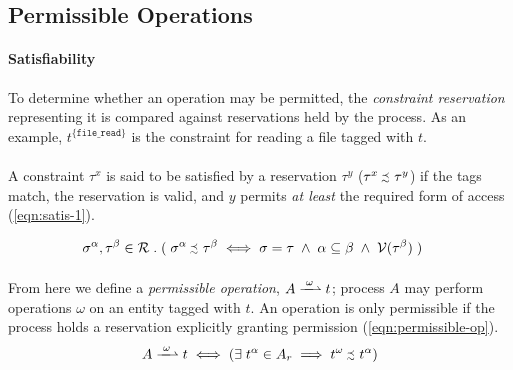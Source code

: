 \subsection{Permissible Operations}
\label{sec:permissible-operations}

\paragraph{Satisfiability} To determine whether an operation may be permitted, the \textit{constraint reservation} representing it is compared against reservations held by the process. As an example, $t^{\{\texttt{file\_read}\}}$ is the constraint for reading a file tagged with $t$.

\paragraph{} A constraint $\tau^{x}$ is said to be satisfied by a reservation $\tau^{y}$ ($\tau^{x} \sprecsim \tau^{y}$) if the tags match, the reservation is valid, and $y$ permits \textit{at least} the required form of access (\ref{eqn:satis-1}). 


\vspace{-5mm}
\begin{align}
    \sigma^{\alpha}, \tau^{\beta} \in \mathcal{R} &\;.\; (\; \sigma^{\alpha} \sprecsim \tau^{\beta} \iff \sigma = \tau \;\wedge\; \alpha \subseteq \beta \;\wedge\; \mathcal{V}(\tau^{\beta}) \;) \label{eqn:satis-1}
\end{align}


\paragraph{} From here we define a \textit{permissible operation}, $A \xrightharpoonup{\;\omega\;} t$; process $A$ may perform operations $\omega$ on an entity tagged with $t$. An operation is only permissible if the process holds a reservation explicitly granting permission (\ref{eqn:permissible-op}).
\begin{equation}
    \label{eqn:permissible-op}
    A \xrightharpoonup{\;\omega\;} t \iff (\exists \; t^{\alpha} \in A_r \implies t^{\omega} \sprecsim t^{\alpha})
\end{equation}

